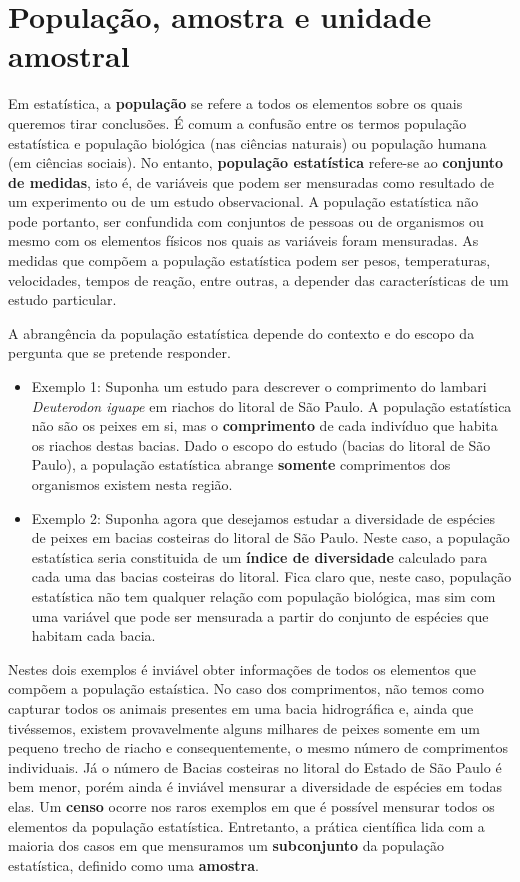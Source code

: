 \documentclass[
]{book}
\begin{document}
\hypertarget{populauxe7uxe3o-amostra-e-unidade-amostral}{%
\section{População, amostra e unidade amostral}\label{populauxe7uxe3o-amostra-e-unidade-amostral}}

Em estatística, a \textbf{população} se refere a todos os elementos sobre os quais queremos tirar conclusões. É comum a confusão entre os termos população estatística e população biológica (nas ciências naturais) ou população humana (em ciências sociais). No entanto, \textbf{população estatística} refere-se ao \textbf{conjunto de medidas}, isto é, de variáveis que podem ser mensuradas como resultado de um experimento ou de um estudo observacional. A população estatística não pode portanto, ser confundida com conjuntos de pessoas ou de organismos ou mesmo com os elementos físicos nos quais as variáveis foram mensuradas. As medidas que compõem a população estatística podem ser pesos, temperaturas, velocidades, tempos de reação, entre outras, a depender das características de um estudo particular.

A abrangência da população estatística depende do contexto e do escopo da pergunta que se pretende responder.

\begin{itemize}
\item
  Exemplo 1: Suponha um estudo para descrever o comprimento do lambari \emph{Deuterodon iguape} em riachos do litoral de São Paulo. A população estatística não são os peixes em si, mas o \textbf{comprimento} de cada indivíduo que habita os riachos destas bacias. Dado o escopo do estudo (bacias do litoral de São Paulo), a população estatística abrange \textbf{somente} comprimentos dos organismos existem nesta região.
\item
  Exemplo 2: Suponha agora que desejamos estudar a diversidade de espécies de peixes em bacias costeiras do litoral de São Paulo. Neste caso, a população estatística seria constituida de um \textbf{índice de diversidade} calculado para cada uma das bacias costeiras do litoral. Fica claro que, neste caso, população estatística não tem qualquer relação com população biológica, mas sim com uma variável que pode ser mensurada a partir do conjunto de espécies que habitam cada bacia.
\end{itemize}

Nestes dois exemplos é inviável obter informações de todos os elementos que compõem a população estaística. No caso dos comprimentos, não temos como capturar todos os animais presentes em uma bacia hidrográfica e, ainda que tivéssemos, existem provavelmente alguns milhares de peixes somente em um pequeno trecho de riacho e consequentemente, o mesmo número de comprimentos individuais. Já o número de Bacias costeiras no litoral do Estado de São Paulo é bem menor, porém ainda é inviável mensurar a diversidade de espécies em todas elas. Um \textbf{censo} ocorre nos raros exemplos em que é possível mensurar todos os elementos da população estatística. Entretanto, a prática científica lida com a maioria dos casos em que mensuramos um \textbf{subconjunto} da população estatística, definido como uma \textbf{amostra}.
\end{document}
